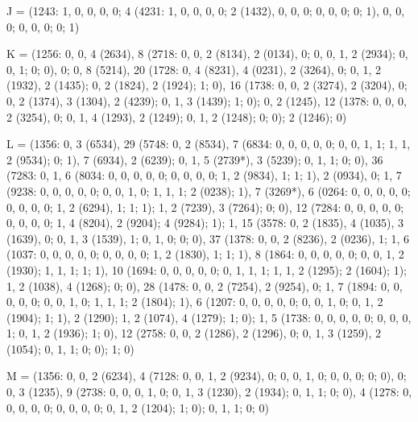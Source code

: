 {J = (1243: 1, 0, 0, 0, 0; 4 (4231: 1, 0, 0, 0, 0; 2 (1432), 0, 0, 0; 0, 0, 0; 0; 1), 0, 0, 0; 0, 0, 0; 0; 1)

K = (1256: 0, 0, 4 (2634), 8 (2718: 0, 0, 2 (8134), 2 (0134), 0; 0, 0, 1, 2 (2934); 0, 0, 1; 0; 0), 0; 0, 8 (5214), 20 (1728: 0, 4 (8231), 4 (0231), 2 (3264), 0; 0, 1, 2 (1932), 2 (1435); 0, 2 (1824), 2 (1924); 1; 0), 16 (1738: 0, 0, 2 (3274), 2 (3204), 0; 0, 2 (1374), 3 (1304), 2 (4239); 0, 1, 3 (1439); 1; 0); 0, 2 (1245), 12 (1378: 0, 0, 0, 2 (3254), 0; 0, 1, 4 (1293), 2 (1249); 0, 1, 2 (1248); 0; 0); 2 (1246); 0)

L = (1356: 0, 3 (6534), 29 (5748: 0, 2 (8534), 7 (6834: 0, 0, 0, 0, 0; 0, 0, 1, 1; 1, 1, 2 (9534); 0; 1), 7 (6934), 2 (6239); 0, 1, 5 (2739*), 3 (5239); 0, 1, 1; 0; 0), 36 (7283: 0, 1, 6 (8034: 0, 0, 0, 0, 0; 0, 0, 0, 0; 1, 2 (9834), 1; 1; 1), 2 (0934), 0; 1, 7 (9238: 0, 0, 0, 0, 0; 0, 0, 1, 0; 1, 1, 1; 2 (0238); 1), 7 (3269*), 6 (0264: 0, 0, 0, 0, 0; 0, 0, 0, 0; 1, 2 (6294), 1; 1; 1); 1, 2 (7239), 3 (7264); 0; 0), 12 (7284: 0, 0, 0, 0, 0; 0, 0, 0, 0; 1, 4 (8204), 2 (9204); 4 (9284); 1); 1, 15 (3578: 0, 2 (1835), 4 (1035), 3 (1639), 0; 0, 1, 3 (1539), 1; 0, 1, 0; 0; 0), 37 (1378: 0, 0, 2 (8236), 2 (0236), 1; 1, 6 (1037: 0, 0, 0, 0, 0; 0, 0, 0, 0; 1, 2 (1830), 1; 1; 1), 8 (1864: 0, 0, 0, 0, 0; 0, 0, 1, 2 (1930); 1, 1, 1; 1; 1), 10 (1694: 0, 0, 0, 0, 0; 0, 1, 1, 1; 1, 1, 2 (1295); 2 (1604); 1); 1, 2 (1038), 4 (1268); 0; 0), 28 (1478: 0, 0, 2 (7254), 2 (9254), 0; 1, 7 (1894: 0, 0, 0, 0, 0; 0, 0, 1, 0; 1, 1, 1; 2 (1804); 1), 6 (1207: 0, 0, 0, 0, 0; 0, 0, 1, 0; 0, 1, 2 (1904); 1; 1), 2 (1290); 1, 2 (1074), 4 (1279); 1; 0); 1, 5 (1738: 0, 0, 0, 0, 0; 0, 0, 0, 1; 0, 1, 2 (1936); 1; 0), 12 (2758: 0, 0, 2 (1286), 2 (1296), 0; 0, 1, 3 (1259), 2 (1054); 0, 1, 1; 0; 0); 1; 0)

M = (1356: 0, 0, 2 (6234), 4 (7128: 0, 0, 1, 2 (9234), 0; 0, 0, 1, 0; 0, 0, 0; 0; 0), 0; 0, 3 (1235), 9 (2738: 0, 0, 0, 1, 0; 0, 1, 3 (1230), 2 (1934); 0, 1, 1; 0; 0), 4 (1278: 0, 0, 0, 0, 0; 0, 0, 0, 0; 0, 1, 2 (1204); 1; 0); 0, 1, 1; 0; 0)
}
